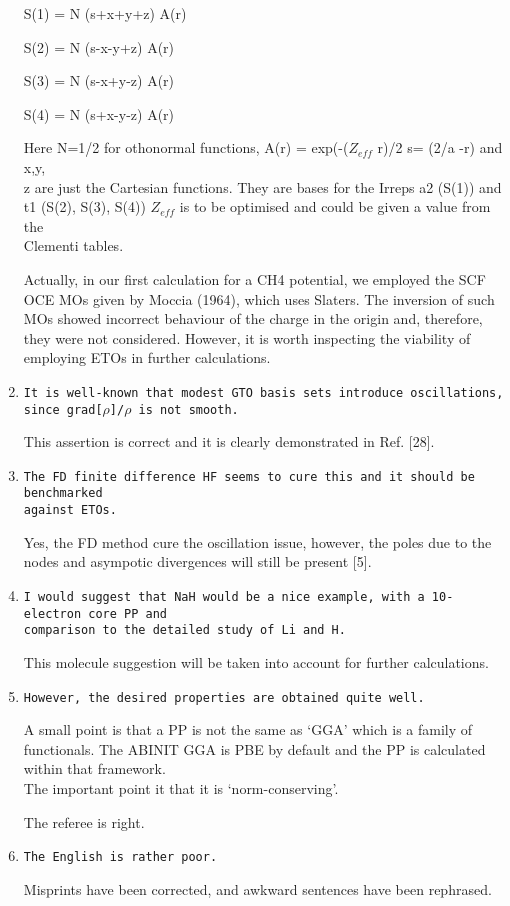 \documentclass[10pt]{article}
\begin{document}
\begin{enumerate}
{ S(1) = N (s+x+y+z) A(r) 

 S(2) = N (s-x-y+z) A(r) 
 
 S(3) = N (s-x+y-z) A(r) 

 S(4) = N (s+x-y-z) A(r) 

 Here N=1/2 for othonormal functions,  A(r) = exp(-($Z_{eff}$ r)/2 
 s= (2/a -r) and x,y,\\z are just the Cartesian functions. They are 
 bases for the Irreps a2 (S(1)) and \\ t1 (S(2), S(3), S(4)) 
 $Z_{eff}$ is to be optimised and could be given a value from the \\
 Clementi  tables.}
 
 Actually, in our first calculation for a CH4 potential, we employed 
 the SCF OCE MOs given by Moccia (1964), which uses Slaters. The
 inversion of such MOs showed incorrect behaviour  of the charge in the 
 origin and, therefore, they were not considered. However, it is worth
 inspecting the viability of employing ETOs in further calculations.

 \item {\tt It is well-known that modest GTO basis sets introduce 
 oscillations, since grad[$\rho$]/$\rho$ is not smooth.}
 
 This assertion is correct and it is clearly demonstrated in Ref. [28].
 
 \item {\tt The FD finite difference HF seems to cure this and it should 
 be benchmarked \\ against ETOs.}
 
 Yes, the FD method cure the oscillation issue, however, the poles due 
 to the nodes and asympotic divergences will still be present [5].

  \item {\tt I would suggest that NaH would be a nice example, with 
  a 10-electron core PP and \\ comparison to the detailed study of Li 
  and H.}
  
  This molecule suggestion will be taken into account for further 
  calculations.

 \item {\tt However, the desired properties are obtained quite well.
 
 A small point is that a PP is not the same as ‘GGA’ which is 
 a family of  functionals. The ABINIT GGA is PBE by default and the PP 
 is calculated within that framework. \\ The important point it that it 
 is ‘norm-conserving’.}
 
 The referee is right. 
 
 \item {\tt The English is rather poor.} 
 
 Misprints have been corrected, and awkward sentences have been
 rephrased.
 
 
\end{enumerate}

 
\end{document}
